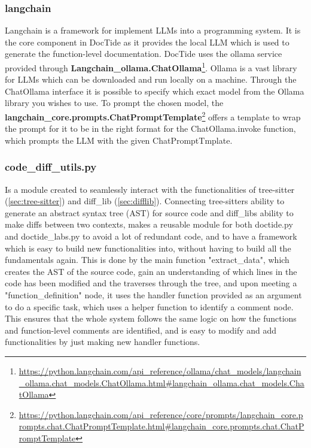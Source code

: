 \subsubsection*{langchain}
Langchain is a framework for implement LLMs into a programming system. It is the core component in DocTide as it provides the local LLM which is used to generate the function-level documentation. DocTide uses the ollama service provided through \textbf{Langchain\_ollama.ChatOllama}\footnote{\url{https://python.langchain.com/api_reference/ollama/chat_models/langchain_ollama.chat_models.ChatOllama.html#langchain_ollama.chat_models.ChatOllama}}. Ollama is a vast library for LLMs which can be downloaded and run locally on a machine. Through the ChatOllama interface it is possible to specify which exact model from the Ollama library you wishes to use. To prompt the chosen model, the \textbf{langchain\_core.prompts.ChatPromptTemplate}\footnote{\url{https://python.langchain.com/api_reference/core/prompts/langchain_core.prompts.chat.ChatPromptTemplate.html#langchain_core.prompts.chat.ChatPromptTemplate}} offers a template to wrap the prompt for it to be in the right format for the ChatOllama.invoke function, which prompts the LLM with the given ChatPromptTmplate.
\subsubsection*{code\_diff\_utils.py}
Is a module created to seamlessly interact with the functionalities of tree-sitter (\ref{sec:tree-sitter}) and diff\_lib (\ref{sec:difflib}). Connecting tree-sitters ability to generate an abstract syntax tree (AST) for source code and diff\_libs ability to make diffs between two contexts, makes a reusable module for both doctide.py and doctide\_labs.py to avoid a lot of redundant code, and to have a framework which is easy to build new functionalities into, without having to build all the fundamentals again. This is done by the main function "extract\_data", which creates the AST of the source code, gain an understanding of which lines in the code has been modified and the traverses through the tree, and upon meeting a "function\_definition" node, it uses the handler function provided as an argument to do a specific task, which uses a helper function to identify a comment node. This ensures that the whole system follows the same logic on how the functions and function-level comments are identified, and is easy to modify and add functionalities by just making new handler functions.

